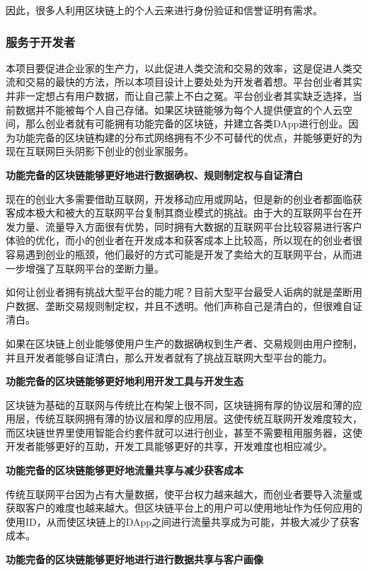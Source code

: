 \documentclass[a4paper,12pt]{article}
\begin{document}
因此，很多人利用区块链上的个人云来进行身份验证和信誉证明有需求。

\subsubsection{服务于开发者}

本项目要促进企业家的生产力，以此促进人类交流和交易的效率，这是促进人类交流和交易的最快的方法，所以本项目设计上要处处为开发者着想。平台创业者其实并非一定想占有用户数据，而让自己蒙上不白之冤。平台创业者其实缺乏选择，当前数据并不能被每个人自己存储。如果区块链能够为每个人提供便宜的个人云空间，那么创业者就有可能拥有功能完备的区块链，并建立各类DApp进行创业。因为功能完备的区块链构建的分布式网络拥有不少不可替代的优点，并能够更好的为现在互联网巨头阴影下创业的创业家服务。

\textbf{功能完备的区块链能够更好地进行数据确权、规则制定权与自证清白}

现在的创业大多需要借助互联网，开发移动应用或网站，但是新的创业者都面临获客成本极大和被大的互联网平台复制其商业模式的挑战。由于大的互联网平台在开发力量、流量导入方面很有优势，同时拥有大数据的互联网平台比较容易进行客户体验的优化，而小的创业者在开发成本和获客成本上比较高，所以现在的创业者很容易遇到创业的瓶颈，他们最好的方式可能是开发了卖给大的互联网平台，从而进一步增强了互联网平台的垄断力量。

如何让创业者拥有挑战大型平台的能力呢？目前大型平台最受人诟病的就是垄断用户数据、垄断交易规则制定权，并且不透明。他们声称自己是清白的，但很难自证清白。

如果在区块链上创业能够使用户生产的数据确权到生产者、交易规则由用户控制，并且开发者能够自证清白，那么开发者就有了挑战互联网大型平台的能力。

\textbf{功能完备的区块链能够更好地利用开发工具与开发生态}

区块链为基础的互联网与传统比在构架上很不同，区块链拥有厚的协议层和薄的应用层，传统互联网拥有薄的协议层和厚的应用层。这使传统互联网开发难度较大，而区块链世界里使用智能合约套件就可以进行创业，甚至不需要租用服务器，这使开发者能够更好的互助，开发工具能够更好的共享，开发难度也相应减少。

\textbf{功能完备的区块链能够更好地流量共享与减少获客成本}

传统互联网平台因为占有大量数据，使平台权力越来越大，而创业者要导入流量或获取客户的难度也越来越大。但区块链平台上的用户可以使用地址作为任何应用的使用ID，从而使区块链上的DApp之间进行流量共享成为可能，并极大减少了获客成本。

\textbf{功能完备的区块链能够更好地进行进行数据共享与客户画像}
\end{document}
